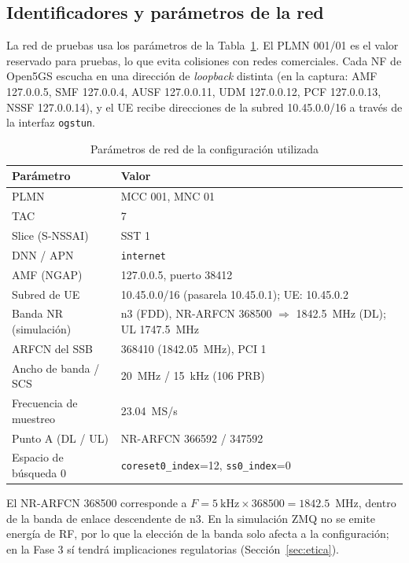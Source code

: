 \documentclass[conference]{IEEEtran}
\begin{document}
\subsection{Identificadores y parámetros de la red}
La red de pruebas usa los parámetros de la Tabla~\ref{tab:param}. El PLMN 001/01 es el valor reservado para pruebas, lo que evita colisiones con redes comerciales. Cada NF de Open5GS escucha en una dirección de \textit{loopback} distinta (en la captura: AMF 127.0.0.5, SMF 127.0.0.4, AUSF 127.0.0.11, UDM 127.0.0.12, PCF 127.0.0.13, NSSF 127.0.0.14), y el UE recibe direcciones de la subred 10.45.0.0/16 a través de la interfaz \texttt{ogstun}.

\begin{table}[!t]
\caption{Parámetros de red de la configuración utilizada}
\label{tab:param}
\centering
\footnotesize
\renewcommand{\arraystretch}{1.15}
\begin{tabular}{p{2.7cm}p{5.1cm}}
\toprule
\textbf{Parámetro} & \textbf{Valor} \\
\midrule
PLMN & MCC 001, MNC 01 \\
TAC & 7 \\
Slice (S-NSSAI) & SST 1 \\
DNN / APN & \texttt{internet} \\
AMF (NGAP) & 127.0.0.5, puerto 38412 \\
Subred de UE & 10.45.0.0/16 (pasarela 10.45.0.1); UE: 10.45.0.2 \\
Banda NR (simulación) & n3 (FDD), NR-ARFCN 368500 $\Rightarrow$ 1842.5~MHz (DL); UL 1747.5~MHz \\
ARFCN del SSB & 368410 (1842.05~MHz), PCI 1 \\
Ancho de banda / SCS & 20~MHz / 15~kHz (106 PRB) \\
Frecuencia de muestreo & 23.04~MS/s \\
Punto A (DL / UL) & NR-ARFCN 366592 / 347592 \\
Espacio de búsqueda 0 & \texttt{coreset0\_index}=12, \texttt{ss0\_index}=0 \\
\bottomrule
\end{tabular}
\end{table}

El NR-ARFCN 368500 corresponde a $F = 5~\mathrm{kHz}\times 368500 = 1842.5$~MHz, dentro de la banda de enlace descendente de n3. En la simulación ZMQ no se emite energía de RF, por lo que la elección de la banda solo afecta a la configuración; en la Fase 3 sí tendrá implicaciones regulatorias (Sección~\ref{sec:etica}).
\end{document}
